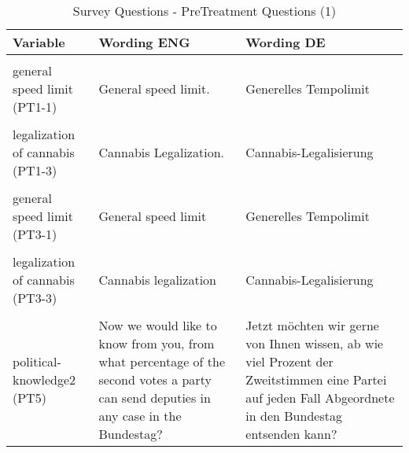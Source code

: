 \documentclass[]{article}
\begin{document}
\begin{table}[!h]

\caption{\label{tab:pret}\label{tab:pret1}Survey Questions - PreTreatment Questions (1)}
\centering
\begin{tabular}[t]{>{\raggedright\arraybackslash}p{3cm}>{\raggedright\arraybackslash}p{7cm}>{\raggedright\arraybackslash}p{7cm}}
\toprule
Variable & Wording ENG & Wording DE\\
\midrule
\cellcolor{gray!6}{issue-pref-forced (PT1)} & \cellcolor{gray!6}{In your opinion, should the federal government implement the following policy proposals? Please select the response option that most closely matches your opinion.} & \cellcolor{gray!6}{Sollte die Bundesregierung Ihrer Meinung nach die folgenden politischen Vorschläge umsetzen? Bitte wählen Sie die Antwortoption, die Ihrer Meinung am ehesten entspricht.}\\
general speed limit (PT1-1) & General speed limit. & Generelles Tempolimit\\
\cellcolor{gray!6}{increase of top tax (PT1-2)} & \cellcolor{gray!6}{Increase the top tax rate} & \cellcolor{gray!6}{Erhöhung des Spitzensteuersatzes}\\
legalization of cannabis (PT1-3) & Cannabis Legalization. & Cannabis-Legalisierung\\
\cellcolor{gray!6}{issue-importance (PT3)} & \cellcolor{gray!6}{How important are the following issues to you?} & \cellcolor{gray!6}{Wie wichtig sind die folgenden Themen für Sie?}\\
\addlinespace
general speed limit (PT3-1) & General speed limit & Generelles Tempolimit\\
\cellcolor{gray!6}{increase of top tax (PT3-2)} & \cellcolor{gray!6}{Increasing the top tax rate} & \cellcolor{gray!6}{Erhöhung des Spitzensteuersatzes}\\
legalization of cannabis (PT3-3) & Cannabis legalization & Cannabis-Legalisierung\\
\cellcolor{gray!6}{political-knowledge1 (PT4)} & \cellcolor{gray!6}{In the federal election, you have two votes, a first vote and a second vote. How is that actually, which of the two votes is decisive for the distribution of seats in the Bundestag?} & \cellcolor{gray!6}{Bei der Bundestagswahl haben Sie ja zwei Stimmen, eine Erststimme und eine Zweitstimme. Wie ist das eigentlich, welche der beiden Stimmen ist ausschlaggebend für die Sitzverteilung im Bundestag?}\\
political-knowledge2 (PT5) & Now we would like to know from you, from what percentage of the second votes a party can send deputies in any case in the Bundestag? & Jetzt möchten wir gerne von Ihnen wissen, ab wie viel Prozent der Zweitstimmen eine Partei auf jeden Fall Abgeordnete in den Bundestag entsenden kann?\\

\end{tabular}
\end{table}
\end{document}
